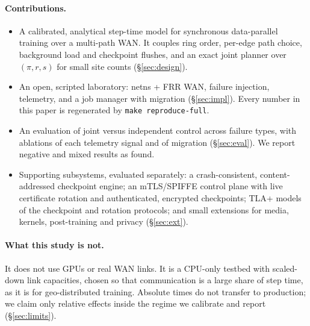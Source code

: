 \paragraph{Contributions.}
\begin{itemize}
\item A calibrated, analytical step-time model for synchronous data-parallel training over a
multi-path WAN. It couples ring order, per-edge path choice, background load and checkpoint flushes, and an
exact joint planner over $(\pi, r, s)$ for small site counts (\S\ref{sec:design}).
\item An open, scripted laboratory: netns + FRR WAN, failure injection, telemetry, and a job manager with
migration (\S\ref{sec:impl}). Every number in this paper is regenerated by \texttt{make reproduce-full}.
\item An evaluation of joint versus independent control across failure types, with ablations of each
telemetry signal and of migration (\S\ref{sec:eval}). We report negative and mixed results as found.
\item Supporting subsystems, evaluated separately: a crash-consistent, content-addressed checkpoint
engine; an mTLS/SPIFFE control plane with live certificate rotation and authenticated, encrypted
checkpoints; TLA+ models of the checkpoint and rotation protocols; and small extensions for media, kernels,
post-training and privacy (\S\ref{sec:ext}).
\end{itemize}

\paragraph{What this study is not.} It does not use GPUs or real WAN links. It is a
CPU-only testbed with scaled-down link capacities, chosen so that communication is a large share of
step time, as it is for geo-distributed training. Absolute times do not transfer to production; we claim
only relative effects inside the regime we calibrate and report (\S\ref{sec:limits}).
